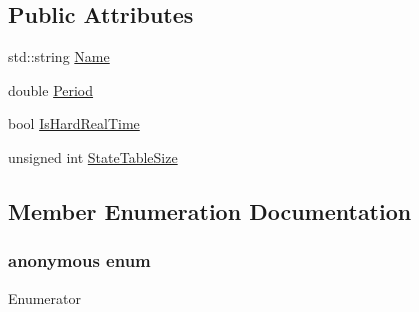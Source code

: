 \subsection*{Public Attributes}
\begin{DoxyCompactItemize}
\item 
std\+::string \hyperlink{classmts_task_periodic_constructor_arg_a2d6bafc9b8014ea8972324df1325fe28}{Name}
\item 
double \hyperlink{classmts_task_periodic_constructor_arg_aa83e6ea04bc9432451c8b9ba9001e629}{Period}
\item 
bool \hyperlink{classmts_task_periodic_constructor_arg_a584cbd7f13e57c11978c9264e78aac46}{Is\+Hard\+Real\+Time}
\item 
unsigned int \hyperlink{classmts_task_periodic_constructor_arg_a63da643cce33a5cb0e262e4cb391c0a6}{State\+Table\+Size}
\end{DoxyCompactItemize}


\subsection{Member Enumeration Documentation}
\hypertarget{classmts_task_periodic_constructor_arg_a26e076204c3149fe911725c21e2a0e94}{}\subsubsection[{anonymous enum}]{\setlength{\rightskip}{0pt plus 5cm}anonymous enum}\label{classmts_task_periodic_constructor_arg_a26e076204c3149fe911725c21e2a0e94}
\begin{Desc}
\item[Enumerator]\par
\begin{description}
\item[{\em 
\hypertarget{classmts_task_periodic_constructor_arg_a26e076204c3149fe911725c21e2a0e94a636d05314de683eba7b7c31f0627f5cb}{}S\+T\+A\+T\+E\+\_\+\+T\+A\+B\+L\+E\+\_\+\+D\+E\+F\+A\+U\+L\+T\+\_\+\+S\+I\+Z\+E\label{classmts_task_periodic_constructor_arg_a26e076204c3149fe911725c21e2a0e94a636d05314de683eba7b7c31f0627f5cb}
}]\end{description}
\end{Desc}


